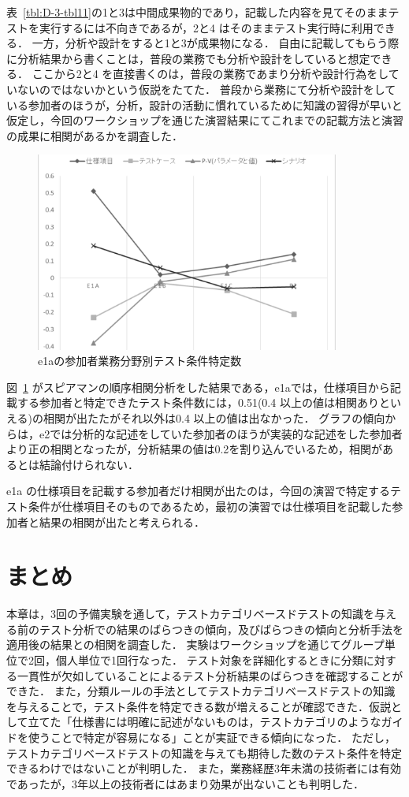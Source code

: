 表~\ref{tbl:D-3-tbl11}の1と3は中間成果物的であり，記載した内容を見てそのままテストを実行するには不向きであるが，2と4 はそのままテスト実行時に利用できる．
一方，分析や設計をすると1と3が成果物になる．
自由に記載してもらう際に分析結果から書くことは，普段の業務でも分析や設計をしていると想定できる．
ここから2と4 を直接書くのは，普段の業務であまり分析や設計行為をしていないのではないかという仮説をたてた．
普段から業務にて分析や設計をしている参加者のほうが，分析，設計の活動に慣れているために知識の習得が早いと仮定し，今回のワークショップを通じた演習結果にてこれまでの記載方法と演習の成果に相関があるかを調査した．

\begin{figure}[h]
  \begin{center}
  \includegraphics[width=10cm]{./image/D-3-Fig13.png}
  \caption{e1aの参加者業務分野別テスト条件特定数}
  \label{fig:D-3-Fig13}
  \end{center}
\end{figure}

図~\ref{fig:D-3-Fig13} がスピアマンの順序相関分析をした結果である，e1aでは，仕様項目から記載する参加者と特定できたテスト条件数には，0.51(0.4 以上の値は相関ありといえる)の相関が出たたがそれ以外は0.4 以上の値は出なかった．
グラフの傾向からは，e2では分析的な記述をしていた参加者のほうが実装的な記述をした参加者より正の相関となったが，分析結果の値は0.2を割り込んでいるため，相関があるとは結論付けられない．

e1a の仕様項目を記載する参加者だけ相関が出たのは，今回の演習で特定するテスト条件が仕様項目そのものであるため，最初の演習では仕様項目を記載した参加者と結果の相関が出たと考えられる．

\newpage
\section{まとめ}
本章は，3回の予備実験を通して，テストカテゴリベースドテストの知識を与える前のテスト分析での結果のばらつきの傾向，及びばらつきの傾向と分析手法を適用後の結果との相関を調査した．
実験はワークショップを通じてグループ単位で2回，個人単位で1回行なった．
テスト対象を詳細化するときに分類に対する一貫性が欠如していることによるテスト分析結果のばらつきを確認することができた．
また，分類ルールの手法としてテストカテゴリベースドテストの知識を与えることで，テスト条件を特定できる数が増えることが確認できた．仮説として立てた「仕様書には明確に記述がないものは，テストカテゴリのようなガイドを使うことで特定が容易になる」ことが実証できる傾向になった．
ただし，テストカテゴリベースドテストの知識を与えても期待した数のテスト条件を特定できるわけではないことが判明した．
また，業務経歴3年未満の技術者には有効であったが，3年以上の技術者にはあまり効果が出ないことも判明した．
